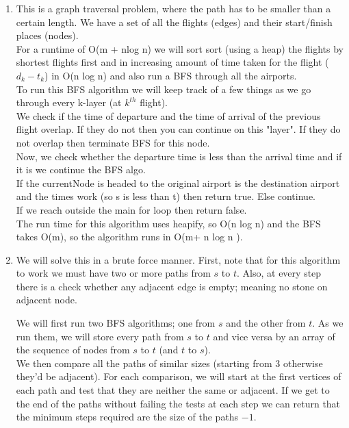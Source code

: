 \begin{enumerate}[1.]
 
 
 
 
\item
This is a graph traversal problem, where the path has to be smaller than a certain length. We have a set of all the flights (edges) and their start/finish places (nodes). \\
For a runtime of O(m + nlog n)  we will sort sort (using a heap) the flights by shortest flights first and in increasing amount of time taken for the flight ($d_k-t_k$) in O(n log n) and also run a BFS through all the airports. \\ 
To run this BFS algorithm we will keep track of a few things as we go through every k-layer (at $k^{th}$ flight).\\
We check if the time of departure and the time of arrival of the previous flight overlap. If they do not then you can continue on this "layer". If they do not overlap then terminate BFS for this node.\\
Now, we check whether the departure time is less than the arrival time and if it is we continue the BFS algo.\\
If the currentNode is headed to the original airport is the destination airport and the times work (so s is less than t) then return true. Else continue. \\ If we reach outside the main for loop then return false.\\
The run time for this algorithm uses heapify, so O(n log n) and the BFS takes O(m), so the algorithm runs in O(m+ n log n ). 


\item
We will solve this in a brute force manner. First, note that for this algorithm to work we must have two or more paths from $s$ to $t$. Also, at every step there is a check whether any adjacent edge is empty; meaning no stone on adjacent node. 

We will first run two BFS algorithms; one from $s$ and the other from $t$. As we run them, we will store every path from $s$ to $t$ and vice versa by an array of the  sequence of nodes from $s$ to $t$ (and $t$ to $s$).\\ We then compare all the paths of similar sizes (starting from $3$ otherwise they'd be adjacent). For each comparison, we will start at the first vertices of each path and test that they are neither the same or adjacent. If we get to the end of the paths without failing the tests at each step we can return that the minimum steps required are the size of the paths $-1$.\\


\end{enumerate}

